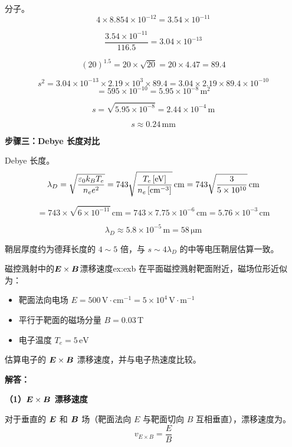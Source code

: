分子。
\[
    4\times8.854\times10^{-12} = 3.54\times10^{-11}
\]

\[
    \frac{3.54\times10^{-11}}{116.5} = 3.04\times10^{-13}
\]

\[
    (20)^{1.5} = 20\times\sqrt{20} = 20\times4.47 = 89.4
\]

\[
    s^2 = 3.04\times10^{-13} \times 2.19\times10^3 \times 89.4 = 3.04\times2.19\times89.4\times10^{-10}
\]
\[
    = 595\times10^{-10} = 5.95\times10^{-8}\,\mathrm{m^2}
\]

\[
    s = \sqrt{5.95\times10^{-8}} = 2.44\times10^{-4}\,\mathrm{m}
\]

\[
    \boxed{s \approx 0.24\,\mathrm{mm}}
\]

\textbf{步骤三：Debye 长度对比}

Debye 长度。
\begin{equation}
    \lambda_D = \sqrt{\frac{\varepsilon_0 k_B T_e}{n_e e^2}} = 743\sqrt{\frac{T_e\,[\mathrm{eV}]}{n_e\,[\mathrm{cm^{-3}}]}}\,\mathrm{cm} = 743\sqrt{\frac{3}{5\times10^{10}}}\,\mathrm{cm}
\label{eq:ch11-debye-length}
\end{equation}

\[
    = 743\times\sqrt{6\times10^{-11}}\,\mathrm{cm} = 743\times7.75\times10^{-6}\,\mathrm{cm} = 5.76\times10^{-3}\,\mathrm{cm}
\]

\[
    \lambda_D \approx 5.8\times10^{-5}\,\mathrm{m} = 58\,\mathrm{\mu m}
\]

鞘层厚度约为德拜长度的 $4\sim5$ 倍，与 $s\sim 4\lambda_D$ 的中等电压鞘层估算一致。


\begin{example}{磁控溅射中的$\bm{E}\times\bm{B}$漂移速度}{ex:exb}
在平面磁控溅射靶面附近，磁场位形近似为：
\begin{itemize}
    \item 靶面法向电场 $E = 500\,\mathrm{V\cdot cm^{-1}} = 5\times10^4\,\mathrm{V\cdot m^{-1}}$
    \item 平行于靶面的磁场分量 $B = 0.03\,\mathrm{T}$
    \item 电子温度 $T_e = 5\,\mathrm{eV}$
\end{itemize}
估算电子的 $\bm{E}\times\bm{B}$ 漂移速度，并与电子热速度比较。
\end{example}

\textbf{解答：}

\textbf{（1）$\bm{E}\times\bm{B}$ 漂移速度}

对于垂直的 $\bm{E}$ 和 $\bm{B}$ 场（靶面法向 $E$ 与靶面切向 $B$ 互相垂直），漂移速度为。
\begin{equation}
    v_{E\times B} = \frac{E}{B}
\label{eq:ch11-exb-drift}
\end{equation}

